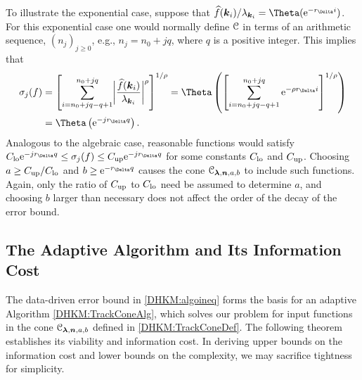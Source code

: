 \documentclass[USenglish]{article}
\theoremstyle{dgthm}
\theoremstyle{dgthm}
\theoremstyle{dgthm}
\theoremstyle{dgthm}
\theoremstyle{dgdef}
\theoremstyle{definition}
\newcommand{\DHKMhf}{\widehat{f}}
\newcommand{\DHKMlo}{\textup{lo}}
\newcommand{\DHKMup}{\textup{up}}
\newcommand{\DHKME}{\textup{e}}
\newcommand{\DHKMbiggabs}[1]{\ensuremath{\biggl \lvert #1 \biggr \rvert}}
\begin{document}
To illustrate the exponential case, suppose that $\DHKMhf(\bsk_i)/\lambda_{\bsk_i} = \Theta(\DHKME^{-r_\Delta i})$.  For this exponential case one would normally define ${\mathcal{C}}$ in terms of an arithmetic sequence, $(n_j)_{j\ge 0}$, e.g., $n_j = n_0 + j q$, where $q$ is a positive integer.  This implies that 
\begin{align*}
    \sigma_j(f) &= \left[ \sum_{i=n_0 + j q -q + 1}^{n_0 + j q} \DHKMbiggabs{\frac{\DHKMhf(\bsk_i)}{\lambda_{\bsk_i}}}^\rho \right]^{1/\rho}
    = \Theta \left( \left [ \sum_{i=n_0 + j q -q + 1}^{n_0 + j q} \DHKME^{- \rho r_\Delta i} \right]^{1/\rho} \right) \\
    & = \Theta \left(  \DHKME^{-j r_{\Delta} q} \right).
\end{align*}
Analogous to the algebraic case, reasonable functions would satisfy 
    $C_{\DHKMlo} \DHKME^{-j r_{\Delta} q} \le \sigma_j(f) \le C_{\DHKMup} \DHKME^{-j r_{\Delta} q}$
for some constants $C_{\DHKMlo}$ and $C_{\DHKMup}$.  Choosing $a \ge C_{\DHKMup}/C_{\DHKMlo} $  and $b \ge \DHKME^{- r_{\Delta} q}$ causes the cone ${\mathcal{C}}_{\boldsymbol{\lambda},{\boldsymbol{n}},a,b}$ to include such functions.  Again, only the ratio of $C_{\DHKMup}$ to $C_{\DHKMlo}$ need be assumed to determine $a$, and choosing $b$ larger than necessary does not affect the order of the decay of the error bound.

\subsection{The Adaptive Algorithm and Its Information Cost} \label{DHKM:SecAdapAlgTrackDecay}

The data-driven error bound in \eqref{DHKM:algoineq} forms the basis for an adaptive Algorithm \ref{DHKM:TrackConeAlg}, which solves our problem for input functions in the cone ${\mathcal{C}}_{\boldsymbol{\lambda},{\boldsymbol{n}},a,b}$ defined in \eqref{DHKM:TrackConeDef}.  The following theorem establishes its viability and information cost. In deriving upper bounds on the information cost and lower bounds on the complexity, we may sacrifice tightness for simplicity.
\end{document}

